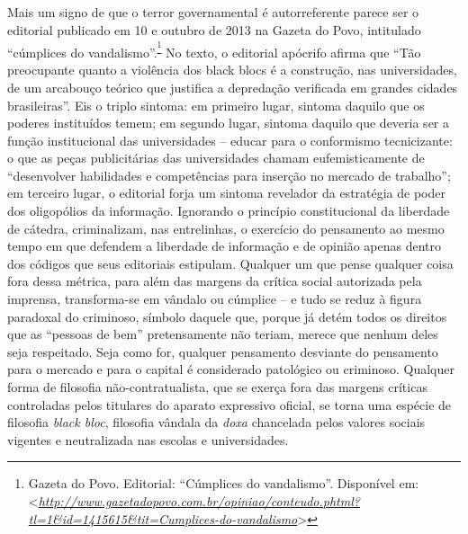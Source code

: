 Mais um signo de que o terror governamental é autorreferente parece ser
o editorial publicado em 10 e outubro de 2013 na Gazeta do Povo,
intitulado ``cúmplices do vandalismo''.\textsuperscript{\footnote{Gazeta
  do Povo. Editorial: ``Cúmplices do vandalismo''. Disponível em:
  \textless{}\href{http://www.gazetadopovo.com.br/opiniao/conteudo.phtml?tl=1\&id=1415615\&tit=Cumplices-do-vandalismo}{\emph{http://www.gazetadopovo.com.br/opiniao/conteudo.phtml?tl=1\&id=1415615\&tit=Cumplices-do-vandalismo}}\textgreater{}}}
No texto, o editorial apócrifo afirma que ``Tão preocupante quanto a
violência dos black blocs é a construção, nas universidades, de um
arcabouço teórico que justifica a depredação verificada em grandes
cidades brasileiras''. Eis o triplo sintoma: em primeiro lugar, sintoma
daquilo que os poderes instituídos temem; em segundo lugar, sintoma
daquilo que deveria ser a função institucional das universidades --
educar para o conformismo tecnicizante: o que as peças publicitárias das
universidades chamam eufemisticamente de ``desenvolver habilidades e
competências para inserção no mercado de trabalho''; em terceiro lugar,
o editorial forja um sintoma revelador da estratégia de poder dos
oligopólios da informação. Ignorando o princípio constitucional da
liberdade de cátedra, criminalizam, nas entrelinhas, o exercício do
pensamento ao mesmo tempo em que defendem a liberdade de informação e de
opinião apenas dentro dos códigos que seus editoriais estipulam.
Qualquer um que pense qualquer coisa fora dessa métrica, para além das
margens da crítica social autorizada pela imprensa, transforma-se em
vândalo ou cúmplice -- e tudo se reduz à figura paradoxal do criminoso,
símbolo daquele que, porque já detém todos os direitos que as ``pessoas
de bem'' pretensamente não teriam, merece que nenhum deles seja
respeitado. Seja como for, qualquer pensamento desviante do pensamento
para o mercado e para o capital é considerado patológico ou criminoso.
Qualquer forma de filosofia não-contratualista, que se exerça fora das
margens críticas controladas pelos titulares do aparato expressivo
oficial, se torna uma espécie de filosofia \emph{black bloc}, filosofia
vândala da \emph{doxa }chancelada pelos valores sociais vigentes e
neutralizada nas escolas e universidades.

